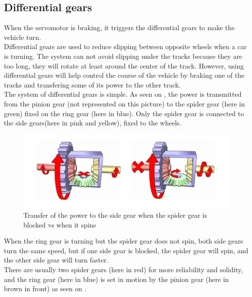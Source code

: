 \subsection{Differential gears}

When the servomotor is braking, it triggers the differential gears to make the vehicle turn.\\
Differential gears are used to reduce slipping between opposite wheels when a car is turning. The system can not avoid slipping under the tracks because they are too long, they will rotate at least around the center of the track. However, using differential gears will help control the course of the vehicle by braking one of the tracks and transfering some of its power to the other track.\\

The system of differential gears is simple. As seen on , the power is transmitted from the pinion gear (not represented on this picture) to the spider gear (here in green) fixed on the ring gear (here in blue). Only the spider gear is connected to the side gears(here in pink and yellow), fixed to the wheels.\\

\begin{figure}[H]
	\centering
	\includegraphics[scale=0.7]{figures/diffGearLight}
	\caption{Transfer of the power to the side gear when the spider gear is blocked vs when it spins \cite{MechanicalEngineering}}
	\label{diffGearLight}
\end{figure}

When the ring gear is turning but the spider gear does not spin, both side gears turn the same speed, but if one side gear is blocked, the spider gear will spin,  and the other side gear will turn faster.\\

There are usually two spider gears (here in red) for more reliability and solidity, and the ring gear (here in blue) is set in motion by the pinion gear (here in brown in front) as seen on .\\

